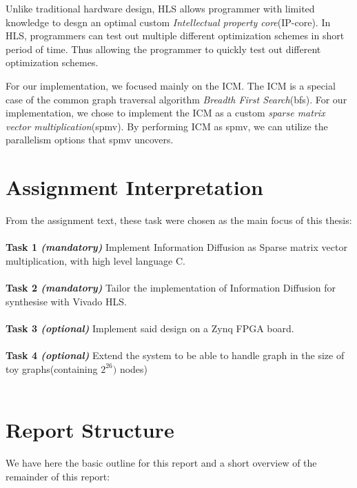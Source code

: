 Unlike traditional hardware design, HLS allows programmer with limited knowledge to desgn an optimal custom \textit{Intellectual property core}(IP-core). In HLS, programmers can test out multiple different optimization schemes in short period of time. Thus allowing the programmer to quickly test out different optimization schemes. 

For our implementation, we focused mainly on the ICM. The ICM is a special case of the common graph traversal algorithm \textit{Breadth First Search}(bfs). For our implementation, we chose to implement the ICM as a custom \textit{sparse matrix vector multiplication}(spmv). By performing ICM as spmv, we can utilize the parallelism options that spmv uncovers. 

\section{Assignment Interpretation}
From the assignment text, these task were chosen as the main focus of this thesis:\\ \hfil \\ \hfil
\textbf{Task 1 \textit{(mandatory)}} Implement Information Diffusion as Sparse matrix vector multiplication, with high level language C.  \\ \hfil \\ \hfil
\textbf{Task 2 \textit{(mandatory)}} Tailor the implementation of Information Diffusion for synthesise with Vivado HLS.   \\ \hfil \\ \hfil
\textbf{Task 3 \textit{(optional)}} Implement said design on a  Zynq FPGA board. \\ \hfil \\ \hfil
\textbf{Task 4 \textit{(optional)}} Extend the system to be able to handle graph in the size of toy graphs(containing $2^{26})$ nodes) \\ \hfil \\ \hfil


\section{Report Structure}
We have here the basic outline for this report and a short overview of the remainder of this report:\\ \hfill

